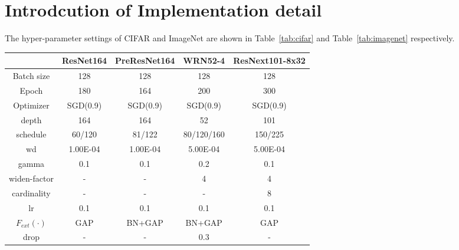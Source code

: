 \documentclass[letterpaper]{article} \usepackage{aaai20}  \usepackage{times}  \usepackage{helvet} \usepackage{courier}  \usepackage[hyphens]{url}  \usepackage{graphicx} \urlstyle{rm} \def\UrlFont{\rm}  \usepackage{graphicx}  \frenchspacing  \setlength{\pdfpagewidth}{8.5in}  \setlength{\pdfpageheight}{11in}  \usepackage{color}
\begin{document}
	\appendix
	\section{Introdcution of Implementation detail}
	The hyper-parameter settings of  CIFAR and ImageNet are shown in Table~\ref{tab:cifar} and Table~\ref{tab:imagenet} respectively. 
	\begin{table*}[htbp]
		\small
		\centering
		\begin{tabular}{|c|c|c|c|c|}
			\toprule
			& ResNet164 & PreResNet164 & WRN52-4 & ResNext101-8x32 \\
			\midrule
			Batch size & 128   & 128   & 128   & 128 \\
			Epoch & 180   & 164   & 200   & 300 \\
			Optimizer & SGD(0.9) & SGD(0.9) & SGD(0.9) & SGD(0.9) \\
			depth & 164   & 164   & 52    & 101 \\
			schedule & 60/120 & 81/122 & 80/120/160 & 150/225 \\
			wd    & 1.00E-04 & 1.00E-04 & 5.00E-04 & 5.00E-04 \\
			gamma & 0.1   & 0.1   & 0.2   & 0.1 \\
			widen-factor & -     & -     & 4     & 4 \\
			cardinality & -     & -     & -     & 8 \\
			lr    & 0.1   & 0.1   & 0.1   & 0.1 \\
			$F_{ext}(\cdot)$ & GAP   & BN+GAP & BN+GAP & GAP \\
			drop  & -     & -     & 0.3   & - \\
			\bottomrule
		\end{tabular}\caption{Implementation detail for \textbf{CIFAR10/100} image classification. Normalization and standard data augmentation (random cropping and horizontal flipping) are applied to the training data. GAP and BN denote Global Average Pooling and Batch Normalization separately. }
		\label{tab:cifar}\vspace{-0.2cm}
	\end{table*}
\end{document}

